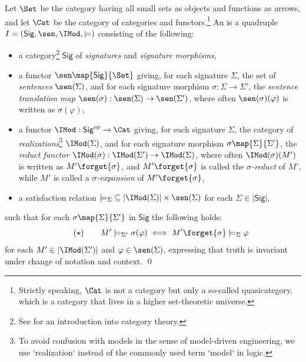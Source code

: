 \documentclass[10pt, a4paper]{isov2}
\newcommand{\Sig}{\mathsf{Sig}}
\begin{document}
\begin{definition}\label{def:inst}  Let $\Set$ be the
category having all small \textsc{}sets as objects and functions as
arrows, and let $\Cat$ be the category
of categories and functors.\footnote {Strictly speaking, $\Cat$ is not a
category but only a so-called quasicategory, which is a category that
lives in a higher set-theoretic universe.}
An
 \cite{GoguenBurstall92} is a quadruple $I=(\Sig,\sen,\IMod,{\models})$
consisting of the following:
%
\begin{itemize}
\item a category\footnote{See \cite{AHS}\cite{MacLane} for an introduction into category theory.} $\Sig$ of \emph{signatures} and \emph{signature morphisms},
\item a functor $\sen\map{\Sig}{\Set}$  giving, for each signature $\Sigma$, the set of
\emph{sentences} $\sen(\Sigma)$, and for each signature morphism
$\sigma:{\Sigma}\to{\Sigma'}$, the \emph{sentence translation map}
$\sen(\sigma):{\sen(\Sigma)}\to{\sen(\Sigma')}$, where often
$\sen(\sigma)(\varphi)$ is written as $\sigma(\varphi)$, \item a
functor $\IMod:{\Sig^{op}}\to{\Cat}$ giving, for each signature
$\Sigma$, the category of \emph{realizations}\footnote{To avoid confusion
with models in the sense of model-driven engineering, we use `realization` instead of  the commonly used term `model` in logic.} $\IMod(\Sigma)$, and for each
signature morphism $\sigma\map{\Sigma}{\Sigma'}$, the \emph{reduct
functor\/} $\IMod(\sigma):{\IMod(\Sigma')}\to {\IMod(\Sigma)}$, where
often $\IMod(\sigma)(M')$ is written as $M'\forget{\sigma}$, and
$M'\forget{\sigma}$ is called the \emph{$\sigma$-reduct} of $M'$,
while $M'$ is called a \emph{$\sigma$-expansion} of
$M'\forget{\sigma}$,
\item a satisfaction relation
${\models_{\Sigma}}\subseteq|{\IMod(\Sigma)|\times\sen(\Sigma)}$ for
each $\Sigma\in |\Sig|$,
\end{itemize}
%
such that for each $\sigma\map{\Sigma}{\Sigma'}$ in $\Sig$ the following  holds:
%
\begin{equation}
\tag{$\star$} \qquad M'\models_{\Sigma'}\sigma(\varphi) \iff
M'\forget{\sigma} \models_{\Sigma} \varphi
\end{equation}
%
for each $M'\in |\IMod(\Sigma')|$ and $\varphi\in \sen(\Sigma)$,
expressing that truth is invariant under change of notation and
context.  \qed
\end{definition}
\end{document}
